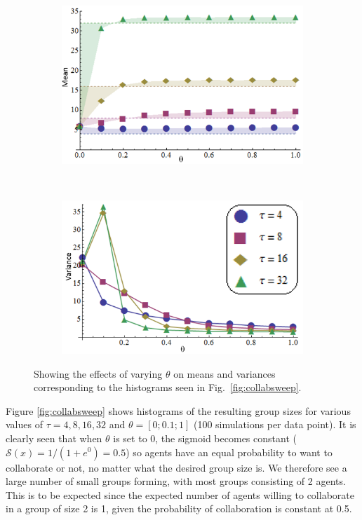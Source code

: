 \documentclass{svmult}  %
\newcommand{\sig}{\mathcal{S}}
\begin{document}
\begin{figure}[!htb]
\begin{subfigure}{0.5\textwidth}
\centering\includegraphics[width=1.0\textwidth]{figures/meansNew.png}
\centering\caption{}\label{fig:means}
\end{subfigure}~
\begin{subfigure}{0.5\textwidth}
\centering\includegraphics[width=1.0\textwidth]{figures/variancesNew.png}
\centering\caption{}\label{fig:vars}
\end{subfigure}
\caption{Showing the effects of varying $\theta$ on means and variances corresponding to the histograms seen in Fig.~\ref{fig:collabsweep}.}\label{fig:meansvars}
\end{figure}

Figure \ref{fig:collabsweep} shows histograms of the resulting group sizes for various values of $\tau=4, 8, 16, 32$ and $\theta=[0;0.1;1]$ (100 simulations per data point). It is clearly seen that when $\theta$ is set to 0, the sigmoid becomes constant ($\sig(x) = 1/(1 + e^{0}) = 0.5$) so agents have an equal probability to want to collaborate or not, no matter what the desired group size is. We therefore see a large number of small groups forming, with most groups consisting of 2 agents. This is to be expected since the expected number of agents willing to collaborate in a group of size 2 is 1, given the probability of collaboration is constant at 0.5.
\end{document}

